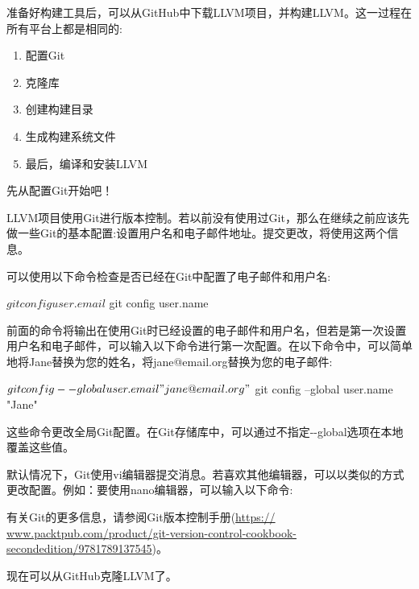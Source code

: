 
准备好构建工具后，可以从GitHub中下载LLVM项目，并构建LLVM。这一过程在所有平台上都是相同的:

\begin{enumerate}
\item
配置Git

\item
克隆库

\item
创建构建目录

\item
生成构建系统文件

\item
最后，编译和安装LLVM
\end{enumerate}

先从配置Git开始吧！


LLVM项目使用Git进行版本控制。若以前没有使用过Git，那么在继续之前应该先做一些Git的基本配置:设置用户名和电子邮件地址。提交更改，将使用这两个信息。

可以使用以下命令检查是否已经在Git中配置了电子邮件和用户名:

\begin{shell}
$ git config user.email
$ git config user.name
\end{shell}

前面的命令将输出在使用Git时已经设置的电子邮件和用户名，但若是第一次设置用户名和电子邮件，可以输入以下命令进行第一次配置。在以下命令中，可以简单地将Jane替换为您的姓名，将jane@email.org替换为您的电子邮件:

\begin{shell}
$ git config --global user.email "jane@email.org"
$ git config --global user.name "Jane"
\end{shell}

这些命令更改全局Git配置。在Git存储库中，可以通过不指定-{}-global选项在本地覆盖这些值。

默认情况下，Git使用vi编辑器提交消息。若喜欢其他编辑器，可以以类似的方式更改配置。例如：要使用nano编辑器，可以输入以下命令:


有关Git的更多信息，请参阅Git版本控制手册(\url{https:// www.packtpub.com/product/git-version-control-cookbook-secondedition/9781789137545})。

现在可以从GitHub克隆LLVM了。


